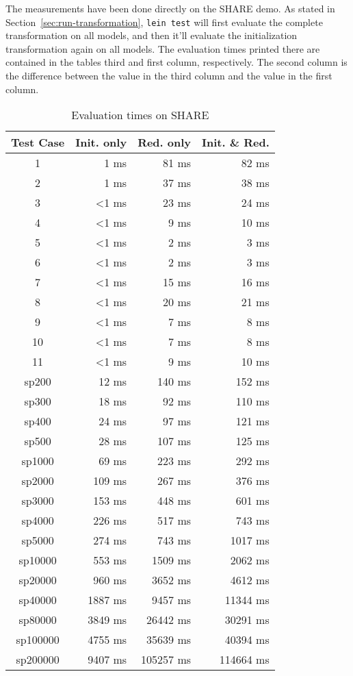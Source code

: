 \documentclass[11pt]{article}
\begin{document}
The measurements have been done directly on the SHARE demo.  As stated in
Section~\ref{sec:run-transformation}, \verb|lein test| will first evaluate the
complete transformation on all models, and then it'll evaluate the
initialization transformation again on all models.  The evaluation times
printed there are contained in the tables third and first column, respectively.
The second column is the difference between the value in the third column and
the value in the first column.


\begin{table}[H]
  \centering
  \begin{tabular}{| c | r | r |r |}
    \hline
    \textbf{Test Case} & \textbf{Init. only} & \textbf{Red. only} & \textbf{Init. \& Red.}\\
    \hline
    1        & 1 ms    & 81 ms & 82 ms\\
    2        & 1 ms    & 37 ms & 38 ms\\
    3        & <1 ms   & 23 ms & 24 ms\\
    4        & <1 ms   & 9 ms & 10 ms\\
    5        & <1 ms   & 2 ms  & 3 ms\\
    6        & <1 ms   & 2 ms  & 3 ms\\
    7        & <1 ms   & 15 ms & 16 ms\\
    8        & <1 ms   & 20 ms & 21 ms\\
    9        & <1 ms   & 7 ms  & 8 ms\\
    10       & <1 ms   & 7 ms  & 8 ms\\
    11       & <1 ms   & 9 ms  & 10 ms\\
    \hline
    sp200    & 12 ms   & 140 ms    & 152 ms\\
    sp300    & 18 ms   & 92 ms     & 110 ms\\
    sp400    & 24 ms   & 97 ms     & 121 ms\\
    sp500    & 28 ms   & 107 ms    & 125 ms\\
    sp1000   & 69 ms   & 223 ms    & 292 ms\\
    sp2000   & 109 ms  & 267 ms    & 376 ms\\
    sp3000   & 153 ms  & 448 ms    & 601 ms\\
    sp4000   & 226 ms  & 517 ms    & 743 ms\\
    sp5000   & 274 ms  & 743 ms    & 1017 ms\\
    sp10000  & 553 ms  & 1509 ms   & 2062 ms\\
    sp20000  & 960 ms  & 3652 ms   & 4612 ms\\
    sp40000  & 1887 ms & 9457 ms   & 11344 ms\\
    sp80000  & 3849 ms & 26442 ms  & 30291 ms\\
    sp100000 & 4755 ms & 35639 ms  & 40394 ms\\
    sp200000 & 9407 ms & 105257 ms & 114664 ms\\
    \hline
  \end{tabular}
  \caption{Evaluation times on SHARE}
  \label{tab:eval-times}
\end{table}
\end{document}
